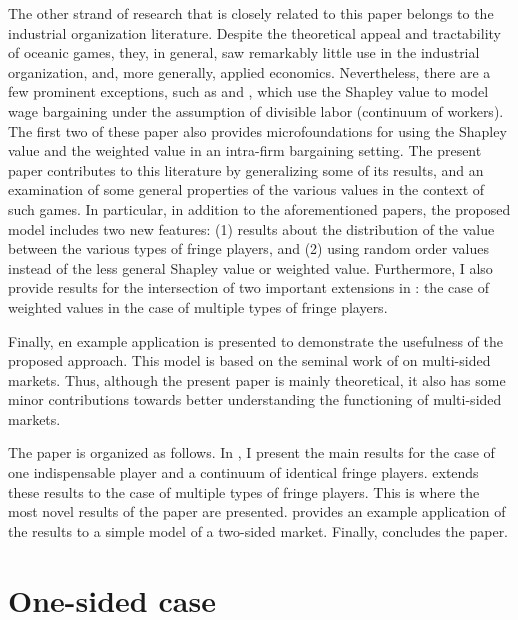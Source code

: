 \documentclass[a4paper]{article}
\begin{document}
The other strand of research that is closely related to this paper belongs to the industrial organization literature.
Despite the theoretical appeal and tractability of oceanic games, they, in general, saw remarkably little use in the industrial organization, and, more generally, applied economics.
Nevertheless, there are a few prominent exceptions, such as \textcite{stole1996intra, stole1996organizational} and \textcite{levy1997individual}, which use the Shapley value to model wage bargaining under the assumption of divisible labor (continuum of workers).
The first two of these paper also provides microfoundations for using the Shapley value and the weighted value in an intra-firm bargaining setting.
The present paper contributes to this literature by generalizing some of its results, and an examination of some general properties of the various values in the context of such games.
In particular, in addition to the aforementioned papers, the proposed model includes two new features: (1) results about the distribution of the value between the various types of fringe players, and (2) using random order values instead of the less general Shapley value or weighted value.
Furthermore, I also provide results for the intersection of two important extensions in \textcite{stole1996intra}: the case of weighted values in the case of multiple types of fringe players.

Finally, en example application is presented to demonstrate the usefulness of the proposed approach.
This model is based on the seminal work of \textcite{armstrong2006competition} on multi-sided markets.
Thus, although the present paper is mainly theoretical, it also has some minor contributions towards better understanding the functioning of multi-sided markets.

The paper is organized as follows.
In , I present the main results for the case of one indispensable player and a continuum of identical fringe players.
 extends these results to the case of multiple types of fringe players.
This is where the most novel results of the paper are presented.
 provides an example application of the results to a simple model of a two-sided market.
Finally,  concludes the paper.


\section{One-sided case}
\label{sec:one_sided}
\end{document}
